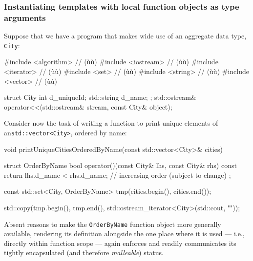\subsubsection[Instantiating templates with local function objects as type arguments]{Instantiating templates with local function objects as type arguments}\label{instantiating-templates-with-local-function-objects-as-type-arguments}

Suppose that we have a program that makes wide use of an aggregate data
type, \lstinline!City!:

\begin{emcppslisting}[emcppsbatch={e2,e3}]
#include <algorithm>  // (ù{}ù)
#include <iostream>   // (ù{}ù)
#include <iterator>   // (ù{}ù)
#include <set>        // (ù{}ù)
#include <string>     // (ù{}ù)
#include <vector>     // (ù{}ù)

struct City
{
    int         d_uniqueId;
    std::string d_name;
};
std::ostream& operator<<(std::ostream& stream,
                         const City&   object);
\end{emcppslisting}

\noindent Consider now the task of writing a function to print unique elements of
an\linebreak[4] \lstinline!std::vector<City>!, ordered by name:

\newpage%
\begin{emcppslisting}[emcppsbatch=e2]
void printUniqueCitiesOrderedByName(const std::vector<City>& cities)
{
    struct OrderByName
    {
        bool operator()(const City& lhs, const City& rhs) const
        {
            return lhs.d_name < rhs.d_name;
                // increasing order (subject to change)
        }
    };

    const std::set<City, OrderByName> tmp(cities.begin(), cities.end());

    std::copy(tmp.begin(), tmp.end(),
              std::ostream_iterator<City>(std::cout, "\n"));
}
\end{emcppslisting}

\noindent Absent reasons to make the \lstinline!OrderByName!
function object more generally available, rendering its definition
alongside the one place where it is used --- i.e., directly within
function scope --- again enforces and readily communicates its tightly
encapsulated (and therefore \emph{malleable}) status.


